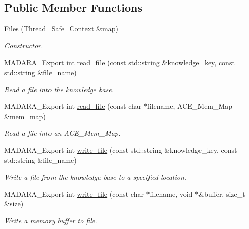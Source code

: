\subsection*{Public Member Functions}
\begin{DoxyCompactItemize}
\item 
\hyperlink{classMadara_1_1Knowledge__Engine_1_1Files_ab74ba1c7e440292454a1055532807104}{Files} (\hyperlink{classMadara_1_1Knowledge__Engine_1_1Thread__Safe__Context}{Thread\_\-Safe\_\-Context} \&map)
\begin{DoxyCompactList}\small\item\em Constructor. \item\end{DoxyCompactList}\item 
MADARA\_\-Export int \hyperlink{classMadara_1_1Knowledge__Engine_1_1Files_ac4f6b2723f6034578b7098c2b4a3d545}{read\_\-file} (const std::string \&knowledge\_\-key, const std::string \&file\_\-name)
\begin{DoxyCompactList}\small\item\em Read a file into the knowledge base. \item\end{DoxyCompactList}\item 
MADARA\_\-Export int \hyperlink{classMadara_1_1Knowledge__Engine_1_1Files_a7279e516f0c1ac8c4bceec159aae7e90}{read\_\-file} (const char $\ast$filename, ACE\_\-Mem\_\-Map \&mem\_\-map)
\begin{DoxyCompactList}\small\item\em Read a file into an ACE\_\-Mem\_\-Map. \item\end{DoxyCompactList}\item 
MADARA\_\-Export int \hyperlink{classMadara_1_1Knowledge__Engine_1_1Files_abe94fbffccd93ded8b5ed45817d95042}{write\_\-file} (const std::string \&knowledge\_\-key, const std::string \&file\_\-name)
\begin{DoxyCompactList}\small\item\em Write a file from the knowledge base to a specified location. \item\end{DoxyCompactList}\item 
MADARA\_\-Export int \hyperlink{classMadara_1_1Knowledge__Engine_1_1Files_acbfe9ba8ef600a8f878741bee7883503}{write\_\-file} (const char $\ast$filename, void $\ast$\&buffer, size\_\-t \&size)
\begin{DoxyCompactList}\small\item\em Write a memory buffer to file. \item\end{DoxyCompactList}\item 

\end{DoxyCompactItemize}
